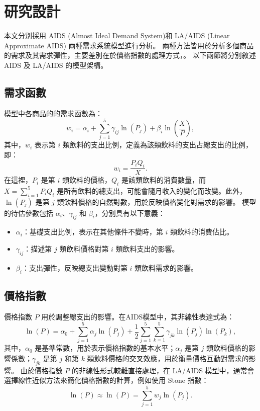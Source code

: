\section{研究設計}

本文分別採用 AIDS (Almost Ideal Demand System)和 LA/AIDS (Linear Approximate AIDS) 兩種需求系統模型進行分析。
兩種方法皆用於分析多個商品的需求及其需求彈性，主要差別在於價格指數的處理方式，。
以下兩節將分別敘述 AIDS 及 LA/AIDS 的模型架構。

\subsection*{需求函數}
 模型中各商品的的需求函數為：
\begin{equation}
w_i = \alpha_i + \sum_{j=1}^{5} \gamma_{ij} \ln(P_j) + \beta_i \ln\left(\frac{X}{P}\right),
\end{equation}
其中，\(w_i\) 表示第 \(i\) 類飲料的支出比例，定義為該類飲料的支出占總支出的比例，即：
\begin{equation}
w_i = \frac{P_i Q_i}{X}.
\end{equation}
在這裡，\(P_i\) 是第 \(i\) 類飲料的價格，\(Q_i\) 是該類飲料的消費數量，而 \(X = \sum_{i=1}^5 P_i Q_i\) 是所有飲料的總支出，可能會隨月收入的變化而改變。此外，\(\ln(P_j)\) 是第 \(j\) 類飲料價格的自然對數，用於反映價格變化對需求的影響。
模型的待估參數包括 \(\alpha_i\)、\(\gamma_{ij}\) 和 \(\beta_i\)，分別具有以下意義：
\begin{itemize}
    \item \(\alpha_i\)：基礎支出比例，表示在其他條件不變時，第 \(i\) 類飲料的消費佔比。
    \item \(\gamma_{ij}\)：描述第 \(j\) 類飲料價格對第 \(i\) 類飲料支出的影響。
    \item \(\beta_i\)：支出彈性，反映總支出變動對第 \(i\) 類飲料需求的影響。
\end{itemize}


\subsection*{價格指數}
價格指數 \(P\) 用於調整總支出的影響。在AIDS模型中，其非線性表達式為：
\begin{equation}
\ln(P) = \alpha_0 + \sum_{j=1}^{5} \alpha_j \ln(P_j) + \frac{1}{2} \sum_{j=1}^{5} \sum_{k=1}^{5} \gamma_{jk} \ln(P_j) \ln(P_k),
\end{equation}
其中，\(\alpha_0\) 是基準常數，用於表示價格指數的基本水平；\(\alpha_j\) 是第 \(j\) 類飲料價格的影響係數；\(\gamma_{jk}\) 是第 \(j\) 和第 \(k\) 類飲料價格的交叉效應，用於衡量價格互動對需求的影響。
由於價格指數 \(P\) 的非線性形式較難直接處理，在 LA/AIDS 模型中，通常會選擇線性近似方法來簡化價格指數的計算，例如使用 Stone 指數：
\begin{equation}
	\ln(P) \approx \ln(P) = \sum_{j=1}^{5} w_j \ln(P_j).
\end{equation}


